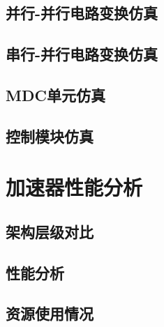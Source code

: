 \subsection[\hspace{-2pt}并行-并行电路变换仿真]{{ \hspace{-8pt}并行-并行电路变换仿真}}
\subsection[\hspace{-2pt}串行-并行电路变换仿真]{{ \hspace{-8pt}串行-并行电路变换仿真}}
\subsection[\hspace{-2pt}MDC单元仿真]{{ \hspace{-8pt}MDC单元仿真}}
\subsection[\hspace{-2pt}控制模块仿真]{{ \hspace{-8pt}控制模块仿真}}


\section[\hspace{-2pt}加速器性能能分析]{{ \hspace{-8pt}加速器性能分析}}\label{section 5-3}
\subsection[\hspace{-2pt}架构层级对比]{{ \hspace{-8pt}架构层级对比}}
\subsection[\hspace{-2pt}性能分析]{{ \hspace{-8pt}性能分析}}
\subsection[\hspace{-2pt}资源使用情况]{{ \hspace{-8pt}资源使用情况}}

